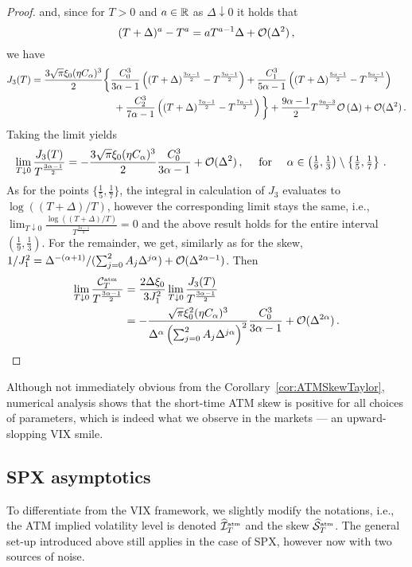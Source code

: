 \begin{proof}
and, since for $T>0$ and $a\in\mathbb{R}$ as $\Delta\downarrow 0$ it holds that
\[
(T+\Delta)^{a} - T^a = a T^{a-1} \Delta + \mathcal{O}(\Delta^2)\,,
\]
we have
\begin{align*}
     J_3(T) &= \frac{3\sqrt{\pi}\xi_0(\eta C_{\alpha})^3}{2} \bigg\{\frac{C_0^3}{3\alpha-1} \left( (T+\Delta)^{\frac{3\alpha - 1}{2}} - T^{\frac{3\alpha - 1}{2}} \right) + \frac{C_1^3}{5\alpha-1} \left( (T+\Delta)^{\frac{5\alpha - 1}{2}} - T^{\frac{5\alpha - 1}{2}} \right) \\
    & \hspace{3cm} + \frac{C_2^3}{7\alpha-1} \left( (T+\Delta)^{\frac{7\alpha - 1}{2}} - T^{\frac{7\alpha - 1}{2}} \right) \bigg\} + \frac{9\alpha - 1}{2}T^{\frac{9\alpha - 3}{2}}\Oo\left(\Delta\right) + \Oo(\Delta^2)\,.
\end{align*}
Taking the limit yields
\begin{align*}
    \lim _{T \downarrow 0} \frac{J_3(T)}{T^{\frac{3\alpha-1}{2}}} &= - \frac{3\sqrt{\pi}\xi_0(\eta C_{\alpha})^3}{2} \frac{C_0^3}{3\alpha-1} + \mathcal{O}(\Delta^2)\,, \quad \textup{ for } \quad \textstyle \alpha\in\left(\frac{1}{9}, \frac{1}{3}\right)\setminus\left\{\frac15, \frac17\right\}\,.
\end{align*}
As for the points $\{\frac15, \frac17\}$, the integral in calculation of $J_3$ evaluates to $\log((T+\Delta)/T)$, however the corresponding limit stays the same, i.e., $\lim_{T\downarrow 0}\frac{\log((T+\Delta)/T)}{T^{\frac{3\alpha-1}{2}}}=0$ and the above result holds for the entire interval $(\frac19,\frac13)$. For the remainder, we get, similarly as for the skew, $1/J_1^2=\Delta^{-(\alpha+1)}/(\sum_{j=0}^2 A_j \Delta^{j\alpha}) + \mathcal{O}(\Delta^{2\alpha-1})$. Then
\begin{align*}
    \lim _{T \downarrow 0} \frac{\mathcal{C}^{\textup{\tiny atm}}_T}{T^{\frac{3\alpha-1}{2}}} &= \frac{2 \Delta \xi_0}{3J_1^2} \lim _{T \downarrow 0} \frac{J_3(T)}{T^{\frac{3\alpha-1}{2}}} \\
    &= - \frac{\sqrt{\pi}\xi_0^2(\eta C_{\alpha})^3}{\Delta^{\alpha}\left(\sum_{j=0}^2 A_j \Delta^{j\alpha}\right)^2} \frac{C_0^3}{3\alpha-1} + \mathcal{O}(\Delta^{2\alpha})\,.
\end{align*}

\end{proof}
Although not immediately obvious from the Corollary~\ref{cor:ATMSkewTaylor}, numerical analysis shows that the short-time ATM skew is positive for all choices of parameters, which is indeed what we observe in the markets --- an upward-slopping VIX smile.
\subsection{SPX asymptotics}\label{sec:SPX_asymptotics}
To differentiate from the VIX framework, we slightly modify the notations, i.e., the ATM implied volatility level is denoted $ \widehat{\mathcal{I}}^{\textup{\tiny atm}}_T$ and the skew $\widehat{\mathcal{S}}^{\textup{\tiny atm}}_T$. The general set-up introduced above still applies in the case of SPX, however now with two sources of noise.

